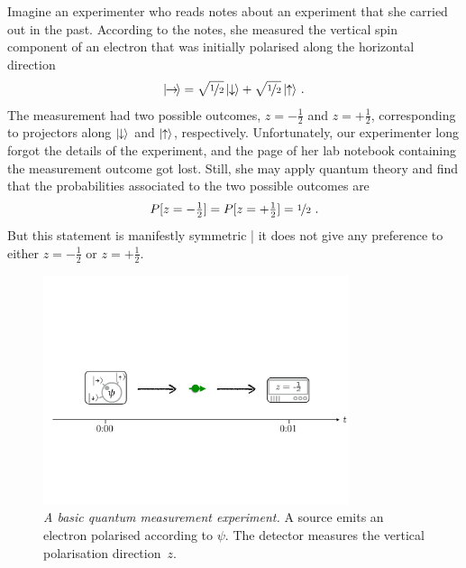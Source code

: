 \documentclass{article}
\theoremstyle{plain}
\theoremstyle{definition}
\newcommand*{\ket}[1]{{| #1 \rangle}}
\newcommand*{\spinup}{\ket{{\hspace{-0.1ex}\uparrow\hspace{-0.1ex}}}}
\newcommand*{\spindown}{\ket{{\hspace{-0.1ex}\downarrow\hspace{-0.1ex}}}}
\newcommand*{\spinright}{\ket{{\hspace{-0.2ex}\rightarrow\hspace{-0.4ex}}}}
\newcommand*{\sminus}{{\textstyle - \frac{1}{2}}}
\newcommand*{\splus}{{\textstyle + \frac{1}{2}}}
\begin{document}
Imagine an experimenter who reads notes about an experiment that she carried out in the past. According to the notes, she measured the vertical spin component of an electron that was initially polarised along the horizontal direction
\begin{align*}
  \spinright = \sqrt{\nicefrac{1}{2}} \, \spindown + \sqrt{\nicefrac{1}{2}} \, \spinup  \ .
\end{align*}
The measurement had two possible outcomes, $z = \sminus$ and $z = \splus$, corresponding to projectors along $\spindown$ and $\spinup$, respectively. Unfortunately, our experimenter long forgot the details of the experiment, and the page of her lab notebook containing the measurement outcome got lost. Still, she may apply quantum theory and find that the probabilities associated to the two possible outcomes are
\begin{align} \label{eq_probstatement}
  P[z = \sminus] = P[z = \splus] = \nicefrac{1}{2} \ .
\end{align}
But this statement is manifestly symmetric | it does not give any preference to either $z = \sminus$ or $z = \splus$. 

\begin{figure}[t]
\centering
\includegraphics[trim= 0.4cm  8.6cm 0cm 11cm, clip=true, width=0.8\textwidth]{BasicMeasurement.pdf}
\caption{\emph{A basic quantum measurement experiment.} A  source emits an electron polarised according to $\psi$. The detector measures the vertical polarisation direction~$z$.
\label{fig_basicmeasurement}
}
\end{figure}
\end{document}
